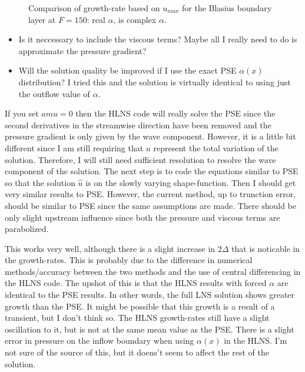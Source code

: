 \documentclass[12pt]{article}
\begin{document}
\begin{figure}
\centering \epsfxsize=4.5in 
\setvlabel{$\gamma$}
\caption {Comparison of growth-rate based on $u_{max}$ for the Blasius
boundary layer at $F=150$: \solid real $\alpha$, \dashed is complex
$\alpha$.\label{f:gr_umax_alphar}}
\end{figure}

\begin{itemize}
\item Is it neccessary to include the viscous terms?  Maybe all I really need
to do is approximate the pressure gradient?
\item Will the solution quality be improved if I use the exact PSE $\alpha(x)$
distribution?  I tried this and the solution is virtually identical to using
just the outflow value of $\alpha$.
\end{itemize}

If you set $amu = 0$ then the HLNS code will really solve the PSE since the
second derivatives in the streamwise direction have been removed and the
pressure gradient is only given by the wave component.  However, it is a
little bit different since I am still requiring that $u$ represent the total
variation of the solution.  Therefore, I will still need sufficient resolution
to resolve the wave component of the solution.  The next step is to code the
equations similar to PSE so that the solution $\hat u$ is on the slowly
varying shape-function.  Then I should get very similar results to PSE.
However, the current method, up to trunction error, should be similar to PSE
since the same assumptions are made.  There should be only slight upstream
influence since both the pressure and viscous terms are parabolized.

This works very well, although there is a slight increase in $2\Delta$ that is
noticable in the growth-rates.  This is probably due to the difference in
numerical methods/accuracy between the two methods and the use of central
differencing in the HLNS code.  The upshot of this is that the HLNS results
with forced $\alpha$ are identical to the PSE results.  In other words, the
full LNS solution shows greater growth than the PSE.  It might be possible
that this growth is a result of a transient, but I don't think so.  The HLNS
growth-rates still have a slight oscillation to it, but is not at the same
mean value as the PSE.  There is a slight error in pressure on the inflow
boundary when using $\alpha(x)$ in the HLNS.  I'm not sure of the source of
this, but it doens't seem to affect the rest of the solution.
\end{document}
